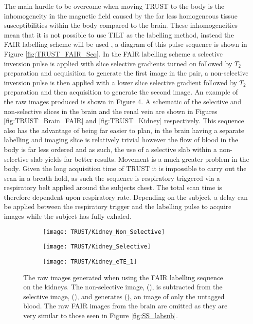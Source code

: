 The main hurdle to be overcome when moving \ac{TRUST} to the body is the inhomogeneity in the magnetic field caused by the far less homogeneous tissue susceptibilities within the body compared to the brain. These inhomogeneities mean that it is not possible to use \ac{TILT} as the labelling method, instead the  \ac{FAIR} labelling scheme will be used \cite{martirosian_fair_2004}, a diagram of this pulse sequence is shown in Figure \ref{fig:TRUST_FAIR_Seq}. In the \ac{FAIR} labelling scheme a selective inversion pulse is applied with slice selective gradients turned on followed by $T_2$ preparation and acquisition to generate the first image in the pair, a non-selective inversion pulse is then applied with a lower slice selective gradient followed by $T_2$ preparation and then acquisition to generate the second image. An example of the raw images produced is shown in Figure \ref{fig:RV_labsub}. A schematic of the selective and non-selective slices in the brain and the renal vein are shown in Figures \ref{fig:TRUST_Brain_FAIR} and \ref{fig:TRUST_Kidney} respectively. This sequence also has the advantage of being far easier to plan, in the brain having a separate labelling and imaging slice is relatively trivial however the flow of blood in the body is far less ordered and as such, the use of a selective slab within a non-selective slab yields far better results. Movement is a much greater problem in the body. Given the long acquisition time of \ac{TRUST} it is impossible to carry out the scan in a breath hold, as such the sequence is respiratory triggered via a respiratory belt applied around the subjects chest. The total scan time is therefore dependent upon respiratory rate. Depending on the subject, a delay can be applied between the respiratory trigger and the labelling pulse to acquire images while the subject has fully exhaled.\\

\begin{figure}[H]
	\centering
	\begin{subfigure}[c]{0.30\textwidth}
		\centering
		\texttt{[image: TRUST/Kidney\_Non\_Selective]}
		\caption{}
		\label{fig:RV_nonsel}
	\end{subfigure}
	\hfill
	\begin{subfigure}[c]{0.30\textwidth}
		\centering
		\texttt{[image: TRUST/Kidney\_Selective]}
		\caption{}
		\label{fig:RV_sel}
	\end{subfigure}
	\hfill
	\begin{subfigure}[c]{0.30\textwidth}
		\centering
		\texttt{[image: TRUST/Kidney\_eTE\_1]}
		\caption{}
		\label{fig:RV_diff}
	\end{subfigure}
	\caption{The raw images generated when using the \ac{FAIR} labelling sequence on the kidneys. The non-selective image, (), is subtracted from the selective image, (), and generates (), an image of only the untagged blood. The raw \ac{FAIR} images from the brain are omitted as they are very similar to those seen in Figure \ref{fig:SS_labsub}.}
	\label{fig:RV_labsub}
\end{figure}


